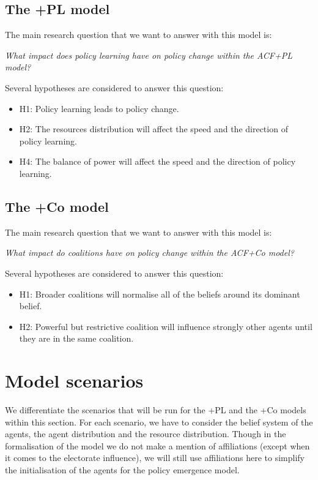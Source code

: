 \documentclass[12pt]{article}
\begin{document}
\subsection{The +PL model}

The main research question that we want to answer with this model is:

\emph{What impact does policy learning have on policy change within the ACF+PL model?}

Several hypotheses are considered to answer this question:

\begin{itemize}
\item H1: Policy learning leads to policy change.
\item H2: The resources distribution will affect the speed and the direction of policy learning.
\item H4: The balance of power will affect the speed and the direction of policy learning.
\end{itemize}

\subsection{The +Co model}

The main research question that we want to answer with this model is:

\emph{What impact do coalitions have on policy change within the ACF+Co model?}

Several hypotheses are considered to answer this question:

\begin{itemize}
\item H1: Broader coalitions will normalise all of the beliefs around its dominant belief.
\item H2: Powerful but restrictive coalition will influence strongly other agents until they are in the same coalition.
\end{itemize}


\section{Model scenarios}
\label{sec:steps}

We differentiate the scenarios that will be run for the +PL and the +Co models within this section. For each scenario, we have to consider the belief system of the agents, the agent distribution and the resource distribution. Though in the formalisation of the model we do not make a mention of affiliations (except when it comes to the electorate influence), we will still use affiliations here to simplify the initialisation of the agents for the policy emergence model.
\end{document}
